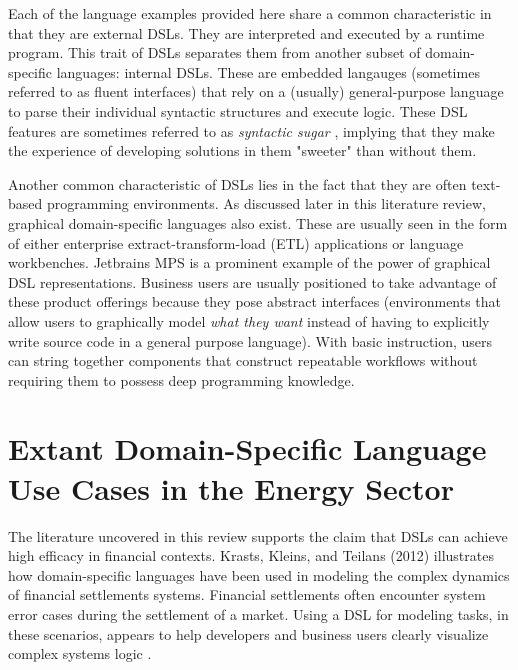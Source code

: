 Each of the language examples provided here share a common characteristic in that they are external DSLs. They are interpreted and executed by a runtime program. This trait of DSLs separates them from another subset of domain-specific languages: internal DSLs. These are embedded langauges (sometimes referred to as fluent interfaces) that rely on a (usually) general-purpose language to parse their individual syntactic structures and execute logic. These DSL features are sometimes referred to as \textit{syntactic sugar} \cite{syntactic-sugar}, implying that they make the experience of developing solutions in them "sweeter" than without them.

Another common characteristic of DSLs lies in the fact that they are often text-based programming environments. As discussed later in this literature review, graphical domain-specific languages also exist. These are usually seen in the form of either enterprise extract-transform-load (ETL) applications or language workbenches. Jetbrains MPS is a prominent example of the power of graphical DSL representations. Business users are usually positioned to take advantage of these product offerings because they pose abstract interfaces (environments that allow users to graphically model \textit{what they want} instead of having to explicitly write source code in a general purpose language). With basic instruction, users can string together components that construct repeatable workflows without requiring them to possess deep programming knowledge.

\section{Extant Domain-Specific Language Use Cases in the Energy Sector}

The literature uncovered in this review supports the claim that DSLs can achieve high efficacy in financial contexts. Krasts, Kleins, and Teilans (2012) illustrates how domain-specific languages have been used in modeling the complex dynamics of financial settlements systems. Financial settlements often encounter system error cases during the settlement of a market. Using a DSL for modeling tasks, in these scenarios, appears to help developers and business users clearly visualize complex systems logic \cite{krasts}.

